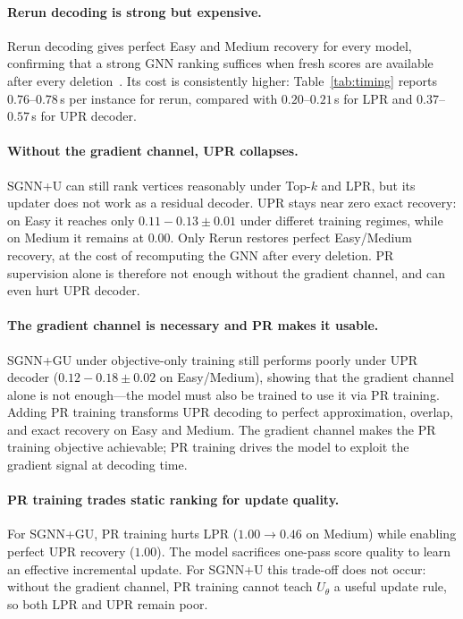 \documentclass[11pt]{article}
\theoremstyle{plain}
\theoremstyle{remark}
\begin{document}
\paragraph{Rerun decoding is strong but expensive.}
Rerun decoding gives perfect Easy and Medium recovery for every model,
confirming that a strong GNN ranking suffices when fresh scores are available after
every deletion~\citep{shoham2026ltr}. Its cost is consistently higher:
Table~\ref{tab:timing} reports $0.76$--$0.78$\,s per instance for rerun,
compared with $0.20$--$0.21$\,s for LPR and $0.37$--$0.57$\,s for UPR decoder.


\paragraph{Without the gradient channel, UPR collapses.}
SGNN+U can still rank vertices reasonably under Top-$k$ and LPR, but its updater
does not work as a residual decoder. UPR stays near zero exact recovery: on Easy
it reaches only $0.11-0.13{\pm}0.01$ under differet training regimes, while on
Medium it remains at $0.00$. Only Rerun restores perfect Easy/Medium recovery,
at the cost of recomputing the GNN after every deletion. PR supervision alone is
therefore not enough without the gradient channel, and can even hurt UPR decoder.


\paragraph{The gradient channel is necessary and PR makes it usable.}
SGNN+GU under objective-only training still performs poorly under UPR decoder
($0.12-0.18{\pm}0.02$ on Easy/Medium), showing that the
gradient channel alone is not enough---the model must also be trained to use it
via PR training. Adding PR training transforms UPR decoding to perfect approximation,
overlap, and exact recovery on Easy and Medium. The gradient channel makes the PR
training objective achievable; PR training drives the model to exploit the gradient
signal at decoding time.

\paragraph{PR training trades static ranking for update quality.}
For SGNN+GU, PR training hurts LPR ($1.00\to0.46$ on Medium) while enabling
perfect UPR recovery ($1.00$). The model sacrifices one-pass score quality to
learn an effective incremental update. For SGNN+U this trade-off does not occur:
without the gradient channel, PR training cannot teach $U_\theta$ a useful update
rule, so both LPR and UPR remain poor.
\end{document}

